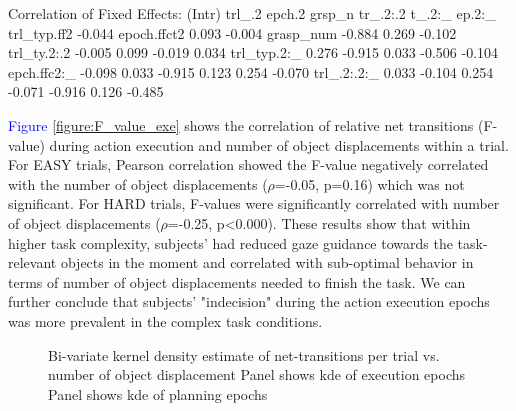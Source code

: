 Correlation of Fixed Effects:
            (Intr) trl_.2 epch.2 grsp_n tr_.2:.2 t_.2:_ ep.2:_
trl_typ.ff2 -0.044                                            
epoch.ffct2  0.093 -0.004                                     
grasp_num   -0.884  0.269 -0.102                              
trl_ty.2:.2 -0.005  0.099 -0.019  0.034                       
trl_typ.2:_  0.276 -0.915  0.033 -0.506 -0.104                
epch.ffc2:_ -0.098  0.033 -0.915  0.123  0.254   -0.070       
trl_.2:.2:_  0.033 -0.104  0.254 -0.071 -0.916    0.126 -0.485
 
\textcolor{Blue}{Figure \ref{figure:F_value_exe}} shows the correlation of relative net transitions (F-value) during action execution and number of object displacements within a trial. For EASY trials, Pearson correlation showed the F-value negatively correlated with the number of object displacements ($\rho$=-0.05, p=0.16) which was not significant. For HARD trials, F-values were significantly correlated with number of object displacements ($\rho$=-0.25, p<0.000). These results show that within higher task complexity, subjects' had reduced gaze guidance towards the task-relevant objects in the moment and correlated with sub-optimal behavior in terms of number of object displacements needed to finish the task. We can further conclude that subjects' "indecision" during the action execution epochs was more prevalent in the complex task conditions.

\begin{figure}[h]
    \centering
    \caption[]{Bi-variate kernel density estimate of net-transitions per trial vs. number of object displacement
    Panel \protect{} shows kde of execution epochs
    Panel \protect{} shows kde of planning epochs}
     \label{figure:kde}
\end{figure}

